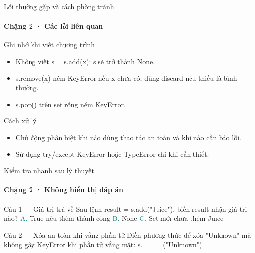 \documentclass[aspectratio=169,10pt]{beamer}
\begin{document}
\begin{frame}[t]{Lỗi thường gặp và cách phòng tránh}
\framesubtitle{Chặng 2 · Các lỗi liên quan}
\begin{alertblock}{Ghi nhớ khi viết chương trình}
\begin{itemize}
\item Không viết s = s.add(x): s sẽ trở thành None.
\item s.remove(x) ném KeyError nếu x chưa có; dùng discard nếu thiếu là bình thường.
\item s.pop() trên set rỗng ném KeyError.
\end{itemize}
\end{alertblock}
\begin{block}{Cách xử lý}
\begin{itemize}
\item Chủ động phân biệt khi nào dùng thao tác an toàn và khi nào cần báo lỗi.
\item Sử dụng try/except KeyError hoặc TypeError chỉ khi cần thiết.
\end{itemize}
\end{block}

\end{frame}

\begin{frame}[t]{Kiểm tra nhanh sau lý thuyết}
\framesubtitle{Chặng 2 · Không hiển thị đáp án}
\small\begin{block}{Câu 1 — Giá trị trả về}
Sau lệnh result = s.add("Juice"), biến result nhận giá trị nào?
\medskip
\quad \textcolor{teal}{A.} True nếu thêm thành công\hspace{3mm}
\quad \textcolor{teal}{B.} None\hspace{3mm}
\quad \textcolor{teal}{C.} Set mới chứa thêm Juice\hspace{3mm}
\end{block}
\begin{block}{Câu 2 — Xóa an toàn khi vắng phần tử}
Điền phương thức để xóa "Unknown" mà không gây KeyError khi phần tử vắng mặt: s.\_\_\_\_("Unknown")
\end{block}
\end{frame}
\end{document}
